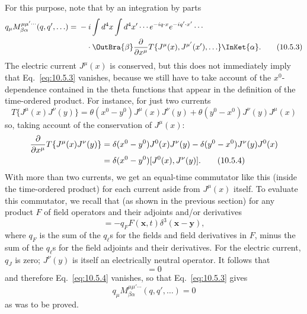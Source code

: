For this purpose, note that by an integration by parts
\begin{align}
  q_\mu M^{\mu\mu'\cdots}_{\beta\alpha}(q,q',\ldots)
  ={}&-i\int d^4x\int d^4x'\cdots
  e^{-iq\cdot x}e^{-iq'\cdot x'}\cdots \notag\\
  &\quad\cdot
  \OutBra{\beta}
  \frac{\partial}{\partial x^\mu}
  T\{J^\mu(x),J^{\mu'}(x'),\ldots\}
  \InKet{\alpha}.
  \tag{10.5.3}\label{eq:10.5.3}
\end{align}
The electric current $J^\mu(x)$ is conserved, but this does not immediately
imply that Eq.~\eqref{eq:10.5.3} vanishes, because we still have to take
account of the $x^0$-dependence contained in the theta functions that appear
in the definition of the time-ordered product. For instance, for just two
currents
\begin{equation*}
  T\{J^\mu(x)J^\nu(y)\}
  =\theta(x^0-y^0)J^\mu(x)J^\nu(y)
  +\theta(y^0-x^0)J^\nu(y)J^\mu(x)
\end{equation*}
so, taking account of the conservation of $J^\mu(x)$:
\begin{align}
  \frac{\partial}{\partial x^\mu}T\{J^\mu(x)J^\nu(y)\}
  ={}&\delta(x^0-y^0)J^0(x)J^\nu(y)
  -\delta(y^0-x^0)J^\nu(y)J^0(x) \notag\\
  ={}&\delta(x^0-y^0)[J^0(x),J^\nu(y)].
  \tag{10.5.4}\label{eq:10.5.4}
\end{align}
With more than two currents, we get an equal-time commutator like this
(inside the time-ordered product) for each current aside from $J^\mu(x)$
itself. To evaluate this commutator, we recall that (as shown in the previous
section) for any product $F$ of field operators and their adjoints and/or
derivatives
\begin{equation*}
  [J^0(\mathbf{x},t),F(\mathbf{y},t)]
  =-q_F F(\mathbf{x},t)\delta^3(\mathbf{x}-\mathbf{y}),
\end{equation*}
where $q_F$ is the sum of the $q_\ell$s for the fields and field derivatives
in $F$, minus the sum of the $q_\ell$s for the field adjoints and their
derivatives. For the electric current, $q_J$ is zero; $J^\nu(y)$ is itself an
electrically neutral operator. It follows that
\begin{equation}
  [J^0(\mathbf{x},t),J^\nu(\mathbf{y},t)]=0
  \tag{10.5.5}\label{eq:10.5.5}
\end{equation}
and therefore Eq.~\eqref{eq:10.5.4} vanishes, so that
Eq.~\eqref{eq:10.5.3} gives
\begin{equation}
  q_\mu M^{\mu\mu'\cdots}_{\beta\alpha}(q,q',\ldots)=0
  \tag{10.5.6}\label{eq:10.5.6}
\end{equation}
as was to be proved.

